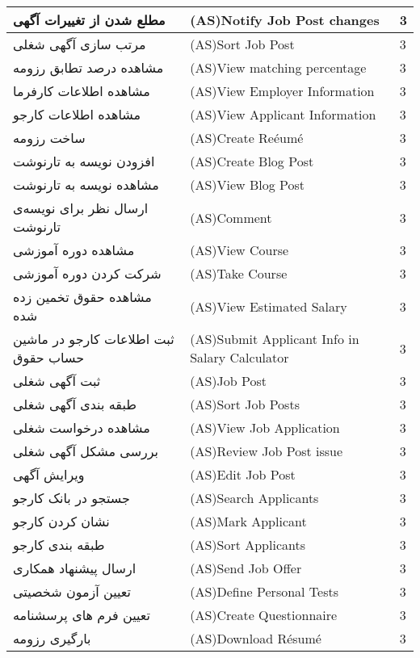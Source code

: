 \documentclass[12pt]{article}
\begin{document}
\begin{longtable}{|l|l|l|}
		\hline
		مطلع شدن از تغییرات آگهی‌ & (AS)Notify Job Post changes & 3     \\
		\hline
		مرتب سازی آگهی شغلی & (AS)Sort Job Post & 3     \\
		\hline
		مشاهده درصد تطابق رزومه & (AS)View matching percentage & 3     \\
		\hline
		مشاهده اطلاعات کارفرما & (AS)View Employer Information & 3     \\
		\hline
		مشاهده اطلاعات کارجو & (AS)View Applicant Information & 3     \\
		\hline
		ساخت رزومه & (AS)Create Reéumé & 3     \\
		\hline
		افزودن نویسه به تارنوشت & (AS)Create Blog Post & 3     \\
		\hline
		مشاهده نویسه به تارنوشت & (AS)View Blog Post & 3     \\
		\hline
		ارسال نظر برای نویسه‌ی تارنوشت & (AS)Comment & 3     \\
		\hline
		مشاهده دوره آموزشی & (AS)View Course & 3     \\
		\hline
		شرکت کردن دوره آموزشی & (AS)Take Course & 3     \\
		\hline
		مشاهده حقوق تخمین زده شده & (AS)View Estimated Salary & 3     \\
		\hline
		ثبت اطلاعات کارجو در ماشین حساب حقوق & (AS)Submit Applicant Info in Salary Calculator & 3     \\
		\hline
		ثبت آگهی شغلی & (AS)Job Post & 3     \\
		\hline
		طبقه بندی آگهی شغلی & (AS)Sort Job Posts & 3     \\
		\hline
		مشاهده درخواست شغلی & (AS)View Job Application & 3     \\
		\hline
		بررسی مشکل آگهی شغلی & (AS)Review Job Post issue & 3     \\
		\hline
		ویرایش آگهی & (AS)Edit Job Post & 3     \\
		\hline
		جستجو در بانک کارجو & (AS)Search Applicants & 3     \\
		\hline
		نشان کردن کارجو & (AS)Mark Applicant & 3     \\
		\hline
		طبقه بندی کارجو & (AS)Sort Applicants & 3     \\
		\hline
		ارسال پیشنهاد همکاری & (AS)Send Job Offer & 3     \\
		\hline
		تعیین آزمون شخصیتی & (AS)Define Personal Tests & 3     \\
		\hline
		تعیین فرم های پرسشنامه & (AS)Create Questionnaire & 3     \\
		\hline
		بارگیری رزومه & (AS)Download Résumé & 3     \\

\end{longtable}
\end{document}
